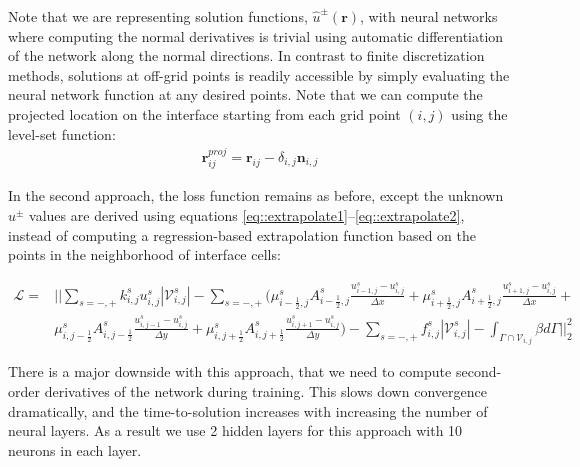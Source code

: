 \documentclass{elsarticle}
\begin{document}
Note that we are representing solution functions, $\hat{u}^\pm(\mathbf{r})$, with neural networks where computing the normal derivatives is trivial using automatic differentiation of the network along the normal directions. In contrast to finite discretization methods, solutions at off-grid points is readily accessible by simply evaluating the neural network function at any desired points. Note that we can compute the projected location on the interface starting from each grid point $(i,j)$ using the level-set function:
\begin{align*}
\mathbf{r}_{ij}^{proj}=\mathbf{r}_{ij} - \delta_{i,j} \mathbf{n}_{i,j}
\end{align*}


In the second approach, the loss function remains as before, except the unknown $u^\pm$ values are derived using equations \ref{eq::extrapolate1}--\ref{eq::extrapolate2}, instead of computing a regression-based extrapolation function based on the points in the neighborhood of interface cells: 

\begin{align*}
\mathcal{L} = & \bigg\vert\bigg\vert \sum_{s=-,+} k_{i,j}^s u_{i,j}^{s} |\mathcal{V}_{i,j}^s| - \sum_{s=-,+}\bigg( \mu_{i-\frac{1}{2},j}^s A_{i-\frac{1}{2},j}^s\frac{u_{i-1,j}^s - u_{i,j}^s}{\Delta x}     +   \mu_{i+\frac{1}{2},j}^s A_{i+\frac{1}{2},j}^s\frac{u_{i+1,j}^s - u_{i,j}^s}{\Delta x} +                                                          \\
	 & \mu_{i, j-\frac{1}{2}}^s A_{i, j-\frac{1}{2}}^s\frac{u_{i,j-1}^s - u_{i,j}^s}{\Delta y} + \mu_{i, j+\frac{1}{2}}^s A_{i, j+\frac{1}{2}}^s\frac{u_{i,j+1}^s - u_{i,j}^s}{\Delta y} \bigg)  -  \sum_{s=-,+} f_{i,j}^{s} |\mathcal{V}_{i,j}^s| - \int_{\Gamma\cap \mathcal{V}_{i,j}} \beta d\Gamma \bigg\vert\bigg\vert_2^2
\end{align*}


There is a major downside with this approach, that we need to compute second-order derivatives of the network during training. This slows down convergence dramatically, and the time-to-solution increases with increasing the number of neural layers. As a result we use 2 hidden layers for this approach with 10 neurons in each layer.
\end{document}
